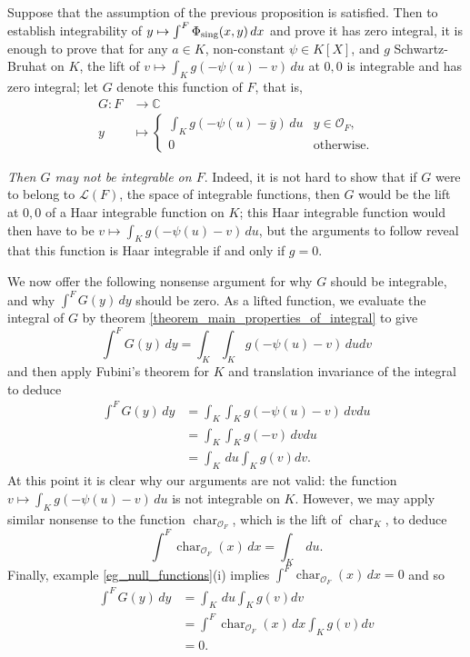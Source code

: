 \documentclass{lmsMODIFIED}
\newcommand{\bb}[1]{\mathbb{#1}}
\renewcommand{\cal}[1]{\mathcal{#1}}
\newcommand{\roi}{\mathcal{O}}
\newcommand{\res}[1]{\overline{#1}}
\newcommand{\sub}[1]{{\mbox{\scriptsize {#1}}}}
\DeclareMathOperator{\Char}{char}
\begin{document}
\begin{remark}\label{remark_nonsense}
Suppose that the assumption of the previous proposition is satisfied. Then to establish integrability of $y\mapsto\int^F\Phi_\sub{sing}(x,y)\,dx$ and prove it has zero integral, it is enough to prove that for any $a\in K$, non-constant $\psi\in K[X]$, and $g$ Schwartz-Bruhat on $K$, the lift of $v\mapsto \int_K g(-\psi(u)-v)\,du$ at $0,0$ is integrable and has zero integral; let $G$ denote this function of $F$, that is,
\begin{align*}
	G:F&\to \bb{C}\\
	y&\mapsto \begin{cases}
		\int_K g(-\psi(u)-\res{y})\,du & y\in\roi_{F}, \\
		0 & \mbox{otherwise.}
		\end{cases}
\end{align*}

\emph{Then $G$ may not be integrable on $F$}. Indeed, it is not hard to show that if $G$ were to belong to $\cal{L}(F)$, the space of integrable functions, then $G$ would be the lift at $0,0$ of a Haar integrable function on $K$; this Haar integrable function would then have to be $v\mapsto \int_K g(-\psi(u)-v)\,du$, but the arguments to follow reveal that this function is Haar integrable if and only if $g=0$.

We now offer the following nonsense argument for why $G$ should be integrable, and why $\int^F G(y)\,dy$ should be zero. As a lifted function, we evaluate the integral of $G$ by theorem \ref{theorem_main_properties_of_integral} to give \[\int^F G(y)\,dy=\int_K\int_K g(-\psi(u)-v)\,dudv\] and then apply Fubini's theorem for $K$ and translation invariance of the integral to deduce
\begin{align*}
\int^F G(y)\,dy
	&=\int_K\int_K g(-\psi(u)-v)\,dvdu\\
	&=\int_K\int_K g(-v)\,dvdu\\
	&=\int_K\,du\int_Kg(v)dv.
\end{align*}
At this point it is clear why our arguments are not valid: the function $v\mapsto \int_K g(-\psi(u)-v)\,du$ is not integrable on $K$. However, we may apply similar nonsense to the function $\Char_{\roi_{F}}$, which is the lift of $\Char_{K}$, to deduce \[\int^F\Char_{\roi_{F}}(x)\,dx=\int_K\,du.\] Finally, example \ref{eg_null_functions}(i) implies $\int^F\Char_{\roi_{F}}(x)\,dx=0$ and so
\begin{align*}
\int^F G(y)\,dy
	&=\int_K\,du\int_Kg(v)dv\\
	&=\int^F\Char_{\roi_{F}}(x)\,dx\int_Kg(v)dv\\
	&=0.
\end{align*}


\end{remark}
\end{document}
